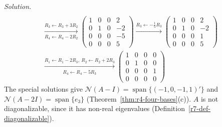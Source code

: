 \documentclass[12pt]{article}
\DeclareMathOperator{\Span}{span}
\theoremstyle{definition}
\newenvironment{solution}{\par\noindent\textit{Solution.}\ }{\par\smallskip}
\begin{document}
\begin{solution}
\[\begin{gathered}
\\
\xrightarrow[R_4\leftarrow R_4-2R_2]{R_3\leftarrow R_3+3R_2}
\begin{pmatrix}1&0&0&2\\0&1&0&-2\\0&0&0&-5\\0&0&0&5\end{pmatrix}
\xrightarrow{R_3\leftarrow-\frac15R_3}
\begin{pmatrix}1&0&0&2\\0&1&0&-2\\0&0&0&1\\0&0&0&5\end{pmatrix}
\\
\xrightarrow[R_4\leftarrow R_4-5R_3]{R_1\leftarrow R_1-2R_3,\ R_2\leftarrow R_2+2R_3}
\begin{pmatrix}1&0&0&0\\0&1&0&0\\0&0&0&1\\0&0&0&0\end{pmatrix}
\end{gathered}
\]
The special solutions give \(\mathcal N(A-I)=\Span\{(-1,0,-1,1)'\}\) and \(\mathcal N(A-2I)=\Span\{e_3\}\)
(Theorem~\ref{thm:r4-four-bases}(c)). \(A\) is not diagonalizable, since it has non-real eigenvalues
(Definition~\ref{r7-def-diagonalizable}).
\end{solution}
\end{document}
